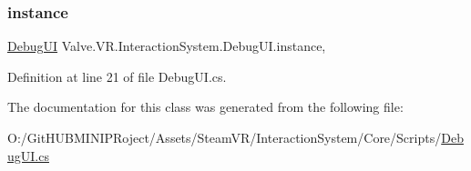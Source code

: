 \subsubsection{\texorpdfstring{instance}{instance}}
{\footnotesize\ttfamily \mbox{\hyperlink{class_valve_1_1_v_r_1_1_interaction_system_1_1_debug_u_i}{Debug\+UI}} Valve.\+V\+R.\+Interaction\+System.\+Debug\+U\+I.\+instance\hspace{0.3cm}{\ttfamily [static]}, {\ttfamily [get]}}



Definition at line 21 of file Debug\+U\+I.\+cs.



The documentation for this class was generated from the following file\+:\begin{DoxyCompactItemize}
\item 
O\+:/\+Git\+H\+U\+B\+M\+I\+N\+I\+P\+Roject/\+Assets/\+Steam\+V\+R/\+Interaction\+System/\+Core/\+Scripts/\mbox{\hyperlink{_debug_u_i_8cs}{Debug\+U\+I.\+cs}}\end{DoxyCompactItemize}
